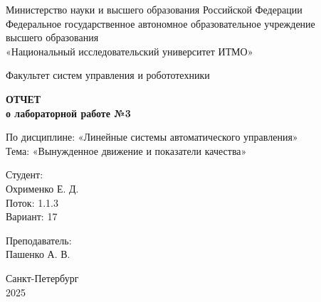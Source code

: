 \documentclass[a4paper,12pt]{article}
\begin{document}
	
	\begin{titlepage}
		\centering
		\vspace*{1cm}
		
		{\small
			Министерство науки и высшего образования Российской Федерации\\
			Федеральное государственное автономное образовательное учреждение\\
			высшего образования\\
			«Национальный исследовательский университет ИТМО»\\
		}
		
		\vspace{2cm}
		
		{\large
			Факультет систем управления и робототехники\\
		}
		
		\vspace{3cm}
		
		{\Huge\bfseries
			ОТЧЕТ\\
		}
		\vspace{0.5cm}
		{\LARGE\bfseries
			о лабораторной работе №3\\
		}
		
		\vspace{1cm}
		
		{\Large
			По дисциплине: «Линейные системы автоматического управления»\\
			\vspace{0.5cm}
			Тема: «Вынужденное движение и показатели качества»\\
		}
		
		\vspace{3cm}
		
		\begin{minipage}{0.4\textwidth}
			\raggedright
			{\large
				Студент:\\
			}
			Охрименко Е. Д.\\
			Поток: 1.1.3\\
			Вариант: 17\\
		\end{minipage}
		\hfill
		\begin{minipage}{0.4\textwidth}
			\raggedleft
			{\large
				Преподаватель:\\
			}
			Пашенко А. В.\\
		\end{minipage}
		
		\vfill
		
		{\large
			Санкт-Петербург\\
			2025\\
		}
		
	\end{titlepage}
	
\end{document}
